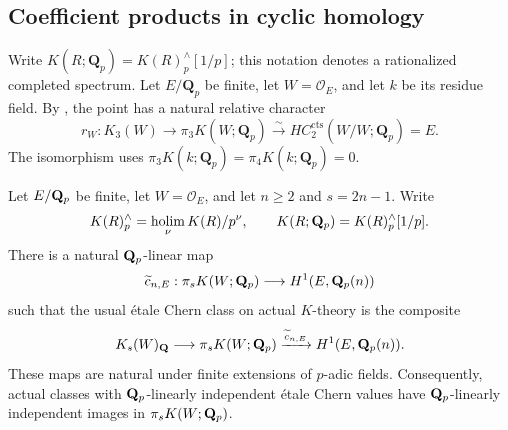\subsection{Coefficient products in cyclic homology}
\label{d3:sec:directtccoefficients}

Write $K(R;\mathbf Q_p)=K(R)^{\wedge}_p[1/p]$; this notation denotes
a rationalized completed spectrum. Let $E/\mathbf Q_p$ be finite, let
$W=\mathcal O_E$, and let $k$ be its residue field. By
\cite[Proposition~4.10 and Example~4.3]{AMMN}, the point has a natural
relative character
\[
 r_W:K_3(W)\longrightarrow\pi_3K(W;\mathbf Q_p)
 \xrightarrow{\sim}HC_2^{\mathrm{cts}}(W/W;\mathbf Q_p)=E.
\]
The isomorphism uses
$\pi_3K(k;\mathbf Q_p)=\pi_4K(k;\mathbf Q_p)=0$.

\begin{lemma}
\label{d3:lem:cherncompletionfactor}
Let $E/\mathbf Q_p$ be finite, let $W=\mathcal O_E$, and let
$n\geq2$ and $s=2n-1$. Write
\[
 K(R)^{\wedge}_p=\operatorname*{holim}_{\nu}K(R)/p^\nu,
 \qquad K(R;\mathbf Q_p)=K(R)^{\wedge}_p[1/p].
\]
There is a natural $\mathbf Q_p$-linear map
\[
 \widetilde c_{n,E}:\pi_sK(W;\mathbf Q_p)
             \longrightarrow H^1(E,\mathbf Q_p(n))
\]
such that the usual \'etale Chern class on actual $K$-theory is
the composite
\[
 K_s(W)_{\mathbf Q}\longrightarrow\pi_sK(W;\mathbf Q_p)
       \xrightarrow{\widetilde c_{n,E}}H^1(E,\mathbf Q_p(n)).
\]
These maps are natural under finite extensions of $p$-adic fields.
Consequently, actual classes with $\mathbf Q_p$-linearly independent
\'etale Chern values have $\mathbf Q_p$-linearly independent images in
$\pi_sK(W;\mathbf Q_p)$.
\end{lemma}


